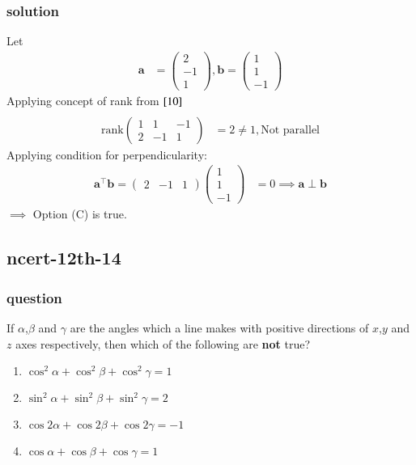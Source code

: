 \documentclass[journal,12pt,onecolumn]{IEEEtran}
\theoremstyle{remark}
\begin{document}
\subsubsection{solution}
Let
\begin{align}
    \textbf{a} &= \begin{pmatrix}
        2\\
        -1\\
        1
    \end{pmatrix} , 
    \textbf{b}=\begin{pmatrix}
        1\\
        1\\
        -1
    \end{pmatrix}
    \end{align}
    Applying concept of rank from $\eqref{10}$
    \begin{align}
                \\  \text{rank}\begin{pmatrix}
        1 & 1 & -1\\
        2 & -1 & 1
    \end{pmatrix} &=2 \neq 1 ,
    \text{Not parallel}
    \end{align}
    Applying condition for perpendicularity:
    \begin{align}
            \textbf{a}^{\top}\textbf{b} = \begin{pmatrix}
        2 &-1 &1
    \end{pmatrix}\begin{pmatrix}
        1\\
        1\\
        -1
    \end{pmatrix} &= 0
    \implies \textbf{a} \perp \textbf{b}
\end{align}
$\implies$ Option (C) is true.




\subsection{ncert-12th-14}
\subsubsection{question}
If $\alpha$,$\beta$ and $\gamma$ are the angles which a line makes with positive directions of $x$,$y$ and $z$ axes respectively, then which of the following are \textbf{not} true?
    \begin{enumerate}
\item $\cos^2{\alpha} + \cos^2{\beta} + \cos^2{\gamma} = 1$
\item $\sin^2{\alpha} + \sin^2{\beta} + \sin^2{\gamma} = 2$
\item $\cos{2\alpha} + \cos{2\beta} + \cos{2\gamma} =-1$
\item $\cos{\alpha} + \cos{\beta} + \cos{\gamma} = 1$
\end{enumerate}
\end{document}
